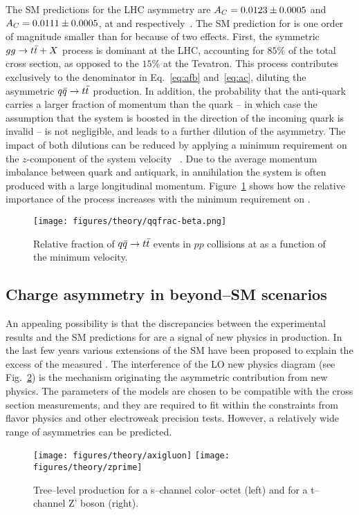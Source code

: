 The SM predictions for the LHC asymmetry are $A_C{}=0.0123\pm{}0.0005$
and $A_C{}=0.0111\pm0.0005$, at \seventev{} and \eighttev{}
respectively~\cite{Bernreuther:2012sx}.  
The SM prediction for \ac{} is one order of magnitude smaller than for
\afb{} because of two effects. First, the symmetric $gg\to t\bar{t}{}+X$
process is dominant at the LHC, accounting for $85\%$ of the total
cross section, as opposed to the $15\%$ at the Tevatron. This process
contributes exclusively to the denominator in Eq.~\ref{eq:afb}
and~\ref{eq:ac}, diluting the asymmetric \mbox{$q\bar{q}{}\to t\bar{t}{}$}
production. In addition, the probability that the anti-quark carries a
larger fraction of momentum than the quark -- in which case the
assumption that the \ttbar{} system is boosted in the direction of the
incoming quark is invalid -- is not negligible, and leads to a further
dilution of the asymmetry. The impact of both dilutions can be reduced
by applying a minimum requirement on the $z$-component of the \ttbar{}
system velocity \betatt{}~\cite{AguilarSaavedra:2011cp}. Due to the
average momentum imbalance between quark and antiquark, in \qqbar{}
annihilation the \ttbar{} system is often produced with a large longitudinal
momentum. Figure~\ref{fig:qqbarfrac} shows how the relative importance
of the \qqbar{} process increases with the minimum requirement on \betatt{}.

\begin{figure}[!htb]
  \centering
  \texttt{[image: figures/theory/qqfrac-beta.png]} 
  \caption{Relative fraction of $q\bar{q}{}\to t\bar{t}{}$ events in $pp$
    collisions at \seventev{} as a function of the minimum \ttbar{} velocity.} 
  \label{fig:qqbarfrac}
\end{figure}

\subsection{Charge asymmetry in beyond--SM scenarios}
\label{sec:bsmca}

An appealing possibility is that the discrepancies between the
experimental results and the SM predictions for \afb{} are a signal of
new physics in \ttbar{} production. In the last few years various
extensions of the SM have been proposed to explain the excess of the
measured \afb{}. The interference of the LO new physics diagram (see
Fig.~\ref{fig:npdiag}) is the mechanism originating the asymmetric
contribution from new physics.
The parameters of the models are chosen to be compatible with the \ttbar{}
cross section measurements, and they are required to fit within the
constraints from flavor physics and other electroweak precision
tests. However, a relatively wide range of asymmetries can be
predicted. 
\begin{figure}[!htb]
  \centering
  \texttt{[image: figures/theory/axigluon]} 
  \texttt{[image: figures/theory/zprime]} 
  \caption{Tree--level \ttbar{} production for a s--channel
    color--octet (left) and for a t--channel Z' boson (right).} 
  \label{fig:npdiag}
\end{figure}

